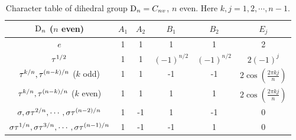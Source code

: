 
\begin{table}[h]
  \caption[Character table of dihedral group $\Dn{n}=C_{nv}$, $n$ even.]{
    Character table of dihedral group $\Dn{n}=C_{nv}$, $n$ even.
    Here $k,j=1,2,\cdots,n-1$.
  }
  \label{tab:DnEven}
  \begin{center}
    \begin{tabular}{c|ccccc}
      $\textrm{D}_{n}$ ($n$ even)  & $A_1$& $A_2$& $B_1$& $B_2$& $E_j$ \\
      \hline
      $  e  $        &   1  &   1  &  1   &  1   &  2  \\
      $\tau_{}^{1/2}$
                           &   1  &   1  &  $(-1)^{n/2}$   & $(-1)^{n/2}$  & $2(-1)^{j}$ \\
      $\tau_{}^{k/n},\tau_{}^{(n-k)/n}$ ($k$ odd)
                           &   1  &   1  & -1   & -1
                                                       & $2\cos(\frac{2\pi kj}{n})$  \\
      $\tau_{}^{k/n},\tau_{}^{(n-k)/n}$ ($k$ even)
                           &   1  &   1  & 1   & 1
                                                       &  $2\cos(\frac{2\pi kj}{n})$  \\
      $\sigma,\sigma\tau_{}^{2/n},\cdots,\sigma\tau_{}^{(n-2)/n}$
                           &   1  &  -1  &  1   & -1   &  0  \\
      $\sigma\tau_{}^{1/n},\sigma\tau_{}^{3/n},\cdots,\sigma\tau_{}^{(n-1)/n}$
                           &   1  &  -1  &  -1   & 1   &  0  \\
    \end{tabular}
  \end{center}
\end{table}
